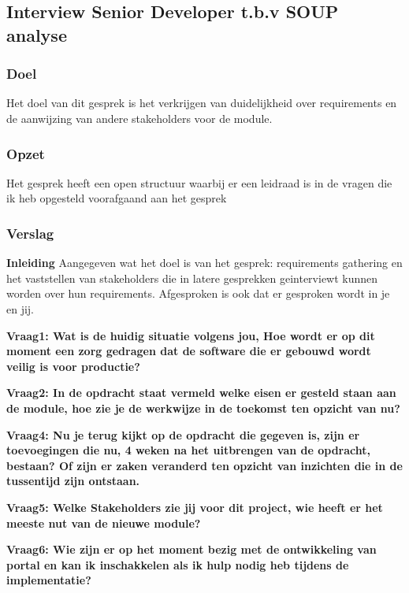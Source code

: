 \subsection{Interview Senior Developer t.b.v SOUP analyse}

\subsubsection{Doel}
Het doel van dit gesprek is het verkrijgen van duidelijkheid over requirements en de aanwijzing van andere stakeholders voor de module.

\subsubsection{Opzet}
Het gesprek heeft een open structuur waarbij er een leidraad is in de vragen die ik heb opgesteld voorafgaand aan het gesprek

\subsubsection{Verslag}
\textbf{Inleiding}
Aangegeven wat het doel is van het gesprek: requirements gathering en het vaststellen van stakeholders die in latere gesprekken geinterviewt kunnen worden over hun requirements. Afgesproken is ook dat er gesproken wordt in je en jij.

\bigskip

\textbf{Vraag1: Wat is de huidig situatie volgens jou, Hoe wordt er op dit moment een zorg gedragen dat de software die er gebouwd wordt veilig is voor productie?}

\lipsum[01]
\bigskip

\textbf{Vraag2: In de opdracht staat vermeld welke eisen er gesteld staan aan de module, hoe zie je de werkwijze in de toekomst ten opzicht van nu?}

\lipsum[03]
\bigskip

\textbf{Vraag4: Nu je terug kijkt op de opdracht die gegeven is, zijn er toevoegingen die nu, 4 weken na het uitbrengen van de opdracht, bestaan? Of zijn er zaken veranderd ten opzicht van inzichten die in de tussentijd zijn ontstaan.}

\lipsum[05]
\bigskip

\textbf{Vraag5: Welke Stakeholders zie jij voor dit project, wie heeft er het meeste nut van de nieuwe module? }

\lipsum[06]
\bigskip

\textbf{Vraag6: Wie zijn er op het moment bezig met de ontwikkeling van portal en kan ik inschakkelen als ik hulp nodig heb tijdens de implementatie?}

